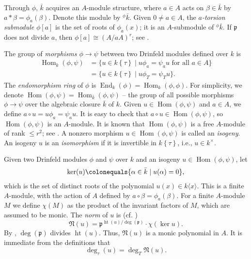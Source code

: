 \documentclass[12pt]{amsart}
\theoremstyle{definition}
\theoremstyle{remark}
\numberwithin{equation}{section}
\numberwithin{thm}{section}
\DeclareMathOperator{\Hom}{Hom}
\DeclareMathOperator{\End}{End}
\DeclareMathOperator{\Ht}{ht}
\newcommand{\fN}{\mathfrak{N}}
\newcommand{\fp}{\mathfrak{p}}
\newcommand{\twist}[1]{#1\!\left\{\tau\right\}}
\newcommand{\atwist}[2]{#1\langle#2\rangle}
\begin{document}
	Through $\phi$, $\bar{k}$ acquires an $A$-module structure, where $a\in A$ acts on $\beta\in \bar{k}$ by $a\ast \beta=\phi_a(\beta)$. Denote this module by ${^\phi}{\bar{k}}$. Given $0\neq a\in A$,
	the \textit{$a$-torsion submodule} $\phi[a]$ is the set of roots of $\phi_a(x)$; it is
	an $A$-submodule of ${^\phi}{\bar{k}}$.
	If $\fp$ does not divide $a$, then $\phi[a]\cong (A/aA)^r$; see \cite[Cor.\ 3.5.3]{PapikianGTM}.
	
	The group of \textit{morphisms $\phi\to \psi$} between two Drinfeld modules defined over $k$ is
	\begin{align*}
		\Hom_k(\phi, \psi) &=\{u\in \twist{k}\mid u\phi_a=\psi_au\text{ for all }a\in A\} \\
		& = \{u\in \twist{k}\mid u\phi_T=\psi_Tu\}.
	\end{align*}
	The \textit{endomorphism ring} of $\phi$ is
	$
	\End_k(\phi) = \Hom_k(\phi, \phi).
	$
	For simplicity, we denote $\Hom(\phi, \psi)=\Hom_{\bar{k}}(\phi, \psi)$ -- the group of all possible morphisms $\phi\to \psi$
	over the algebraic closure $\bar{k}$ of $k$.
	Given $u\in \Hom(\phi, \psi)$ and $a\in A$, we define $a\circ u=u\phi_a=\psi_au$.
	It is easy to check that $a\circ u \in \Hom(\phi, \psi)$, so $\Hom(\phi, \psi)$ is an $A$-module. It is known
	that $\Hom(\phi, \psi)$ is a free $A$-module of rank $\leq r^2$; see \cite[Thm. 3.4.1]{PapikianGTM}.
	A nonzero morphism $u\in \Hom(\phi, \psi)$ is called an \textit{isogeny}.
	An isogeny $u$ is an \textit{isomorphism} if it is invertible in $\twist{k}$, i.e., $u\in k^\times$.
	
	
	
	Given two Drinfeld modules $\phi$ and $\psi$ over $k$ and an isogeny $u\in \Hom(\phi, \psi)$, let
	\[
	\ker(u)\colonequals \{\alpha\in \bar{k}\mid u(\alpha)=0\},
	\]
	which is the set of distinct roots of the polynomial $u(x)\in \atwist{k}{x}$. This is a finite $A$-module, with the action of $A$ defined by $a\circ \beta  =\phi_a(\beta)$.
	For a finite $A$-module $M$ we define $\chi(M)$ as the product of the invariant factors of $M$, which are assumed to be monic.
	The \textit{norm} of $u$ is (cf. \cite[p. 194]{Gekeler91})
	\begin{equation}\label{eqNormu}
		\fN(u)=
		\fp^{\Ht(u)/\deg(\fp)}\cdot \chi(\ker u).
	\end{equation}
	By \cite[Prop. 3.3.4]{PapikianGTM},  $\deg(\fp)$ divides $\Ht(u)$. Thus, $\fN(u)$ is a monic
	polynomial in $A$. It is immediate from the definitions that
	\begin{equation}\label{eqtaudeg}
		\deg_\tau(u)=\deg_T\fN(u).
	\end{equation}
	
\end{document}
